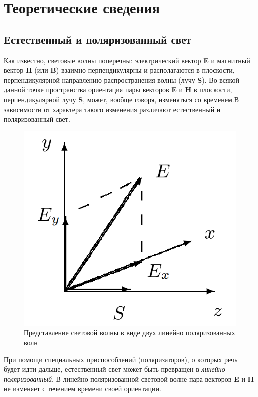 \documentclass[a4paper,12pt]{article}
\begin{document}
\section*{Теоретические сведения}

\subsection*{Естественный и поляризованный свет}

Как известно, световые волны поперечны: электрический вектор \textbf{E} и магнитный вектор \textbf{H} (или \textbf{B}) взаимно перпендикулярны и располагаются в плоскости, перпендикулярной направлению распространения волны (лучу \textbf{S}). Во всякой данной точке пространства ориентация пары векторов \textbf{E} и \textbf{H} в плоскости, перпендикулярной лучу \textbf{S}, может, вообще говоря, изменяться со временем.В зависимости от характера такого изменения различают естественный и поляризованный свет.

\begin{figure} 
	\includegraphics[width=\linewidth]{fig1}
	\caption{Представление световой волны в виде двух линейно поляризованных волн}
\end{figure}


При помощи специальных приспособлений (поляризаторов), о которых речь будет идти дальше, естественный свет может быть превращен в \textit{линейно поляризованный}. В линейно поляризованной световой волне пара векторов \textbf{E} и \textbf{H} не изменяет с течением времени своей ориентации.
\end{document}
